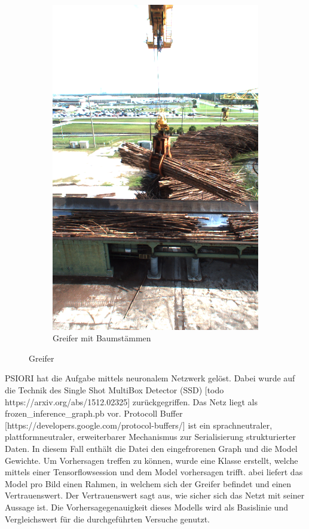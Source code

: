 \begin{figure}[h]
\begin{subfigure}[c]{0.49\textwidth}
			\includegraphics[width=1\textwidth, center]{bilder/Grundlagen/Logs_14.png}
			\caption[Bsp. Bild: Greifer mit Baumstämmen]{Greifer mit Baumstämmen}
			\label{img:Logs}	
		\end{subfigure}
		\caption{Greifer}
		\label{img:Greifer}
	\end{figure}	

	PSIORI hat die Aufgabe mittels neuronalem Netzwerk gelöst. Dabei wurde auf die Technik des Single Shot MultiBox Detector (SSD) [todo https://arxiv.org/abs/1512.02325] zurückgegriffen. Das Netz liegt als frozen\_inference\_graph.pb vor. Protocoll Buffer  [https://developers.google.com/protocol-buffers/] ist ein sprachneutraler, plattformneutraler, erweiterbarer Mechanismus zur Serialisierung strukturierter Daten. In diesem Fall enthält die Datei den eingefrorenen Graph und die Model Gewichte. Um Vorhersagen treffen zu können, wurde eine Klasse erstellt, welche mittels einer Tensorflowsession und dem Model vorhersagen trifft.  abei liefert das Model pro Bild einen Rahmen, in welchem sich der Greifer befindet und einen Vertrauenswert. Der Vertrauenswert sagt aus, wie sicher sich das Netzt mit seiner Aussage ist. Die Vorhersagegenauigkeit dieses Modells wird als Basislinie und Vergleichswert für die durchgeführten Versuche genutzt.
		
